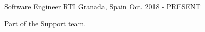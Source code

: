 

\begin{cventries}

  \cventry
    {Software Engineer} %
    {RTI} %
    {Granada, Spain} %
    {Oct. 2018 - PRESENT} %
    {
      \begin{cvitems} %
        \item {Part of the Support team.}
      \end{cvitems}
    }

\end{cventries}
